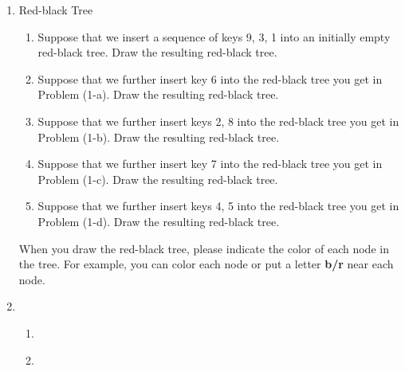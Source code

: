 \documentclass[12pt,a4paper]{article}
\makeatletter
\newtheorem*{solution}{Solution}
\theoremstyle{definition}
\renewenvironment{solution}[1][Solution] {\par\pushQED{\qed}\normalfont\topsep6\p@\@plus6\p@\relax\trivlist\item[\hskip\labelsep\bfseries#1\@addpunct{.}]\ignorespaces}{\popQED\endtrivlist\@endpefalse} \makeatother
\makeatother
\begin{document}
\begin{enumerate}

\item	Red-black Tree
	\begin{enumerate}
		\item Suppose that we insert a sequence of keys 9, 3, 1 into an initially empty red-black tree. Draw the resulting red-black tree.
		
		\item Suppose that we further insert key 6 into the red-black tree you get in Problem (1-a). Draw the resulting red-black tree.
		
		\item Suppose that we further insert keys 2, 8 into the red-black tree you get in Problem (1-b). Draw the resulting red-black tree.
		
		\item Suppose that we further insert key 7 into the red-black tree you get in Problem (1-c). Draw the resulting red-black tree.
		
		\item Suppose that we further insert keys 4, 5 into the red-black tree you get in Problem (1-d). Draw the resulting red-black tree.
		
	\end{enumerate}
	
	When you draw the red-black tree, please indicate the color of each node in the tree.
For example, you can color each node or put a letter \textbf{b/r} near each node.

\begin{solution} 
\begin{enumerate}
    \item
\begin{figure}[h]
\centering
{}
\end{figure}

\item
\begin{figure}[h]
\centering
{}
\end{figure}


\end{enumerate}
\end{solution}
\end{enumerate}
\end{document}
